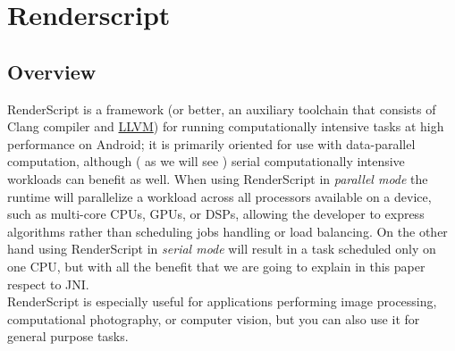 \documentclass[11pt,english]{article}
\begin{document}
\section{Renderscript}
\subsection{Overview}
RenderScript is a framework (or better, an auxiliary toolchain that consists of Clang compiler and \href{ http://llvm.org/}{LLVM}\cite{mlwa}) for running computationally intensive tasks at high performance on Android; it is primarily oriented for use with data-parallel computation, although ( as we will see ) serial computationally intensive workloads can benefit as well. When using RenderScript in \textit{parallel mode} the runtime will parallelize a workload across all processors available on a device, such as multi-core CPUs, GPUs, or DSPs, allowing the developer to express algorithms rather than scheduling jobs handling or load balancing. On the other hand using RenderScript in \textit{serial mode} will result in a task scheduled only on one CPU, but with all the benefit that we are going to explain in this paper respect to JNI.\\RenderScript is especially useful for applications performing image processing, computational photography, or computer vision, but you can also use it for general purpose tasks.
\end{document}
